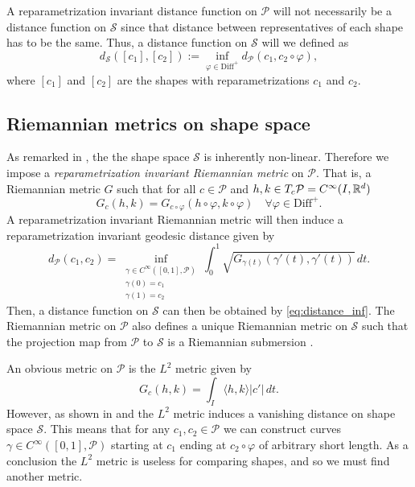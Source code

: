 A reparametrization invariant distance function on \(\mathcal{P}\) will not necessarily be a distance function on \(\mathcal{S}\) since  that distance between representatives of each shape has to be the same. Thus, a distance function on \(\mathcal{S}\) will we defined as
\begin{equation*}
  d_\mathcal{S} ([c_1],[c_2]) := \inf_{\varphi \in \text{Diff}^+}{  d_{\mathcal{P}}(c_1,c_2 \circ \varphi)},
  \label{eq:distance_inf}
\end{equation*}
where  \([c_1]\) and  \([c_2]\) are the shapes with reparametrizations \(c_1\) and  \(c_2\).

\subsection{Riemannian metrics on shape space}
As remarked in \cite{bauer2014overview}, the the shape space \(\mathcal{S}\) is inherently non-linear. Therefore we impose a \emph{reparametrization invariant Riemannian metric}  on \(\mathcal{P}\). That is, a Riemannian metric \(G\) such that for all \( c \in \mathcal{P}\) and \(h,k \in  T_c \mathcal{P} = C^\infty(I, \mathbb{R}^d) \)
\begin{equation*}
  G_c(h,k) = G_{c \circ \varphi}(h\circ \varphi, k \circ \varphi) \quad \forall \varphi \in \text{Diff}^+.
\end{equation*}
A reparametrization invariant Riemannian metric will then induce a reparametrization invariant  geodesic distance given by
\begin{equation*}
  d_\mathcal{P}(c_1, c_2) = \inf_{
    \substack{
      \gamma \in C^{\infty}([0,1], \mathcal{P}) \\
      \gamma(0) = c_1 \\
      \gamma(1) = c_2
    }
  } \int_0^1 \sqrt{G_{\gamma(t)}(\gamma'(t),\gamma'(t))} \, dt.
\end{equation*}
Then, a distance function on \(\mathcal{S}\) can then be obtained by \eqref{eq:distance_inf}. The Riemannian metric on \(\mathcal{P}\) also defines a unique Riemannian metric on \(\mathcal{S}\) such that the projection map from \(\mathcal{P}\) to \(\mathcal{S}\) is a Riemannian submersion \cite[Section 6]{bauer2014_rprop}.

An obvious metric on \(\mathcal{P}\) is the \(L^2\) metric  given by
\begin{equation*}
  G_c(h,k) = \int_I \langle h, k\rangle \vert c'\vert \,dt.
\end{equation*}
However, as shown in \cite{michor2003vanishingl2} and \cite{michor2004vanishing_generalized} the \(L^2\) metric induces a vanishing distance on shape space \(\mathcal{S}\). This means that for any \(c_1, c_2 \in \mathcal{P}\) we can construct curves \(\gamma \in C^{\infty}([0,1],\mathcal{P})\) starting at \(c_1\) ending at \(c_2 \circ \varphi\) of arbitrary short length. As a conclusion the \(L^2\) metric is useless for comparing shapes, and so we must find another metric.

